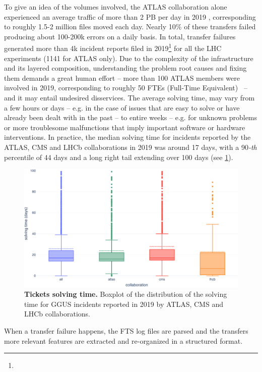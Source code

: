To give an idea of the volumes involved, the ATLAS collaboration alone experienced an average traffic of more than 2 PB per day in 2019 \cite{calafiura2020design_report}, corresponding to roughly 1.5-2 million files moved each day.
Nearly 10\% of these transfers failed producing about 100-200k errors on a daily basis. 
In total, transfer failures generated more than 4k incident reports filed in 2019\footnote{\ggus} for all the LHC experiments (1141 for ATLAS only).
Due to the complexity of the infrastructure and its layered composition, understanding the problem root causes and fixing them demands a great human effort -- more than 100 ATLAS members were involved in 2019, corresponding to roughly 50 FTEs (Full-Time Equivalent)~\cite{jarka2019ftes} -- and it may entail undesired disservices.
The average solving time, may vary from a few hours or days -- e.g. in the case of issues that are easy to solve or have already been dealt with in the past -- to entire weeks -- e.g. for unknown problems or more troublesome malfunctions that imply important software or hardware interventions.
In practice, the median solving time for incidents reported by the ATLAS, CMS and LHCb collaborations in 2019 was around 17 days, with a 90\textit{-th} percentile of 44 days and a long right tail extending over 100 days (see \cref{fig:ggus_time}).
\begin{figure}
    \centering
    \includegraphics[width=\textwidth]{figures/220_introduction/GGUS_time.pdf}
    \caption{\textbf{Tickets solving time.} Boxplot of the distribution of the solving time for GGUS incidents reported in 2019 by ATLAS, CMS and LHCb collaborations.}
    \label{fig:ggus_time}
\end{figure}
When a transfer failure happens,
the FTS log files are parsed and the transfers more relevant features are extracted and re-organized in a structured format. 
